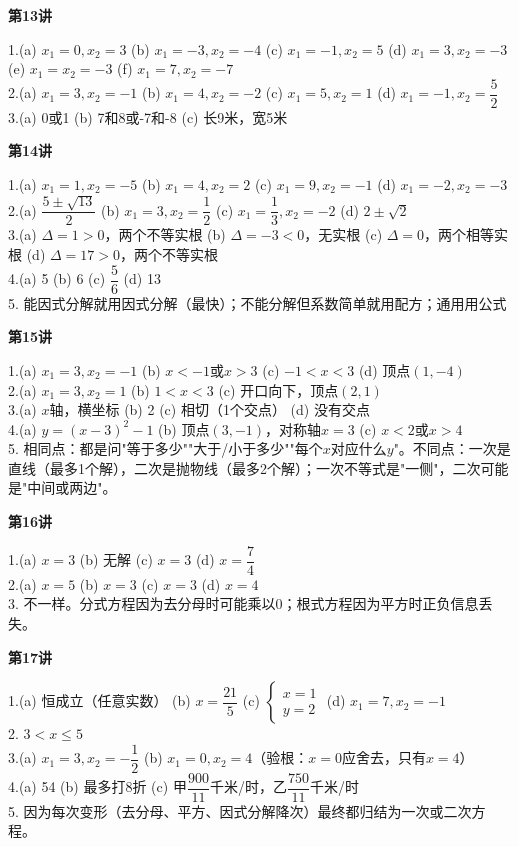 
\textbf{第13讲}

1.(a) $x_1=0,x_2=3$ \quad (b) $x_1=-3,x_2=-4$ \quad (c) $x_1=-1,x_2=5$ \quad (d) $x_1=3,x_2=-3$ \quad (e) $x_1=x_2=-3$ \quad (f) $x_1=7,x_2=-7$\\
2.(a) $x_1=3,x_2=-1$ \quad (b) $x_1=4,x_2=-2$ \quad (c) $x_1=5,x_2=1$ \quad (d) $x_1=-1,x_2=\dfrac52$\\
3.(a) 0或1 \quad (b) 7和8或-7和-8 \quad (c) 长9米，宽5米

\textbf{第14讲}

1.(a) $x_1=1,x_2=-5$ \quad (b) $x_1=4,x_2=2$ \quad (c) $x_1=9,x_2=-1$ \quad (d) $x_1=-2,x_2=-3$\\
2.(a) $\dfrac{5\pm\sqrt{13}}{2}$ \quad (b) $x_1=3,x_2=\dfrac12$ \quad (c) $x_1=\dfrac13,x_2=-2$ \quad (d) $2\pm\sqrt2$\\
3.(a) $\Delta=1>0$，两个不等实根 \quad (b) $\Delta=-3<0$，无实根 \quad (c) $\Delta=0$，两个相等实根 \quad (d) $\Delta=17>0$，两个不等实根\\
4.(a) 5 \quad (b) 6 \quad (c) $\dfrac56$ \quad (d) 13\\
5. 能因式分解就用因式分解（最快）；不能分解但系数简单就用配方；通用用公式

\textbf{第15讲}

1.(a) $x_1=3,x_2=-1$ \quad (b) $x<-1$或$x>3$ \quad (c) $-1<x<3$ \quad (d) 顶点$(1,-4)$\\
2.(a) $x_1=3,x_2=1$ \quad (b) $1<x<3$ \quad (c) 开口向下，顶点$(2,1)$\\
3.(a) $x$轴，横坐标 \quad (b) 2 \quad (c) 相切（1个交点） \quad (d) 没有交点\\
4.(a) $y=(x-3)^2-1$ \quad (b) 顶点$(3,-1)$，对称轴$x=3$ \quad (c) $x<2$或$x>4$\\
5. 相同点：都是问"等于多少""大于/小于多少""每个$x$对应什么$y$"。不同点：一次是直线（最多1个解），二次是抛物线（最多2个解）；一次不等式是"一侧"，二次可能是"中间或两边"。


\textbf{第16讲}

1.(a) $x=3$ \quad (b) 无解 \quad (c) $x=3$ \quad (d) $x=\dfrac74$\\
2.(a) $x=5$ \quad (b) $x=3$ \quad (c) $x=3$ \quad (d) $x=4$\\
3. 不一样。分式方程因为去分母时可能乘以0；根式方程因为平方时正负信息丢失。

\textbf{第17讲}

1.(a) 恒成立（任意实数） \quad (b) $x=\dfrac{21}{5}$ \quad (c) $\begin{cases}x=1\\y=2\end{cases}$ \quad (d) $x_1=7,x_2=-1$\\
2. $3<x\le5$\\
3.(a) $x_1=3,x_2=-\dfrac12$ \quad (b) $x_1=0,x_2=4$（验根：$x=0$应舍去，只有$x=4$）\\
4.(a) 54 \quad (b) 最多打8折 \quad (c) 甲$\dfrac{900}{11}$千米/时，乙$\dfrac{750}{11}$千米/时\\
5. 因为每次变形（去分母、平方、因式分解降次）最终都归结为一次或二次方程。

